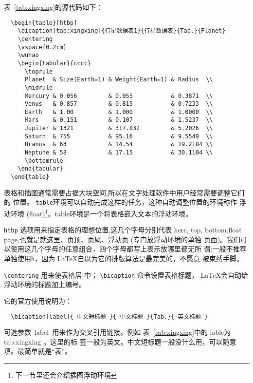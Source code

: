 表~\ref{tab:xingxing}的源代码如下：
\vspace{1em}
\begin{lstlisting}
  \begin{table}[htbp]
    \bicaption[tab:xingxing]{行星数据表1}{行星数据表}{Tab.}{Planet}
    \centering
    \vspace{0.2cm}
    \wuhao
    \begin{tabular}{cccc}
      \toprule
      Planet  & Size(Earth=1) & Weight(Earth=1) & Radius  \\
      \midrule
      Mercury & 0.056         & 0.055           & 0.3871  \\
      Venus   & 0.857         & 0.815           & 0.7233  \\
      Earth   & 1.00          & 1.000           & 1.0000  \\
      Mars    & 0.151         & 0.107           & 1.5237  \\
      Jupiter & 1321          & 317.832         & 5.2026  \\
      Saturn  & 755           & 95.16           & 9.5549  \\
      Uranus  & 63            & 14.54           & 19.2184 \\
      Neptune & 58            & 17.15           & 30.1104 \\
      \bottomrule
    \end{tabular}
  \end{table}
\end{lstlisting}

表格和插图通常需要占据大块空间,所以在文字处理软件中用户经常需要调整它们的
位置。 \texttt{table}环境可以自动完成这样的任务，这种自动调整位置的环境称作
浮动环境 (float)\footnote{下一节里还会介绍插图浮动环境}。table环境是一个将表格嵌入文本的浮动环境。

\texttt{htbp} 选项用来指定表格的理想位置,这几个字母分别代表 here, top,
bottom,float page,也就是就这里、页顶、页尾、浮动页 (专门放浮动环境的单独
页面)。我们可以使用这几个字母的任意组合，四个字母都写上表示放哪里都无所
谓;一般不推荐单独使用\texttt{h}，因为 \LaTeX{}自以为它的排版算法是最完美的，不愿意
被束缚手脚。

\verb|\centering| 用来使表格居
中； \verb|\bicaption| 命令设置表格标题， \LaTeX{}会自动给
浮动环境的标题加上编号。

它的官方使用说明为：
\begin{lstlisting}
  \bicaption[label]{ 中文短标题 }{ 中文标题 }{Tab.}{ 英文标题 }
\end{lstlisting}
可选参数~label~用来作为交叉引用链接。例如
表~\ref{tab:xingxing}中的 lable为 tab:xingxing 。这里的标
签一般为英文。中文短标题一般没什么用，可以随意填。最简单就是“表”。

